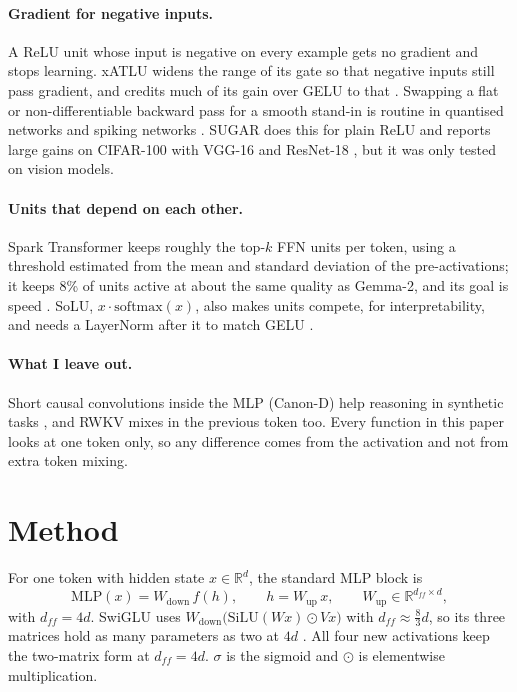 \documentclass{article}
\begin{document}
\paragraph{Gradient for negative inputs.}
A ReLU unit whose input is negative on every example gets no gradient and stops learning.
xATLU widens the range of its gate so that negative inputs still pass gradient, and credits much of its gain over GELU to that \citep{huang2024xatlu}.
Swapping a flat or non-differentiable backward pass for a smooth stand-in is routine in quantised networks \citep{bengio2013ste} and spiking networks \citep{neftci2019surrogate}.
SUGAR does this for plain ReLU and reports large gains on CIFAR-100 with VGG-16 and ResNet-18 \citep{horuz2025sugar}, but it was only tested on vision models.

\paragraph{Units that depend on each other.}
Spark Transformer keeps roughly the top-$k$ FFN units per token, using a threshold estimated from the mean and standard deviation of the pre-activations; it keeps 8\% of units active at about the same quality as Gemma-2, and its goal is speed \citep{you2025spark}.
SoLU, $x \cdot \mathrm{softmax}(x)$, also makes units compete, for interpretability, and needs a LayerNorm after it to match GELU \citep{elhage2022solu}.

\paragraph{What I leave out.}
Short causal convolutions inside the MLP (Canon-D) help reasoning in synthetic tasks \citep{allenzhu2025canon}, and RWKV mixes in the previous token too.
Every function in this paper looks at one token only, so any difference comes from the activation and not from extra token mixing.

\section{Method}
\label{sec:method}

For one token with hidden state $x \in \mathbb{R}^{d}$, the standard MLP block is
\begin{equation}
  \label{eq:mlp}
  \mathrm{MLP}(x) = W_{\text{down}}\, f(h), \qquad h = W_{\text{up}}\, x, \qquad W_{\text{up}} \in \mathbb{R}^{d_{ff} \times d},
\end{equation}
with $d_{ff} = 4d$.
SwiGLU uses $W_{\text{down}}\big(\mathrm{SiLU}(W x) \odot V x\big)$ with $d_{ff} \approx \tfrac{8}{3}d$, so its three matrices hold as many parameters as two at $4d$ \citep{shazeer2020glu}.
All four new activations keep the two-matrix form at $d_{ff} = 4d$.
$\sigma$ is the sigmoid and $\odot$ is elementwise multiplication.
\end{document}
